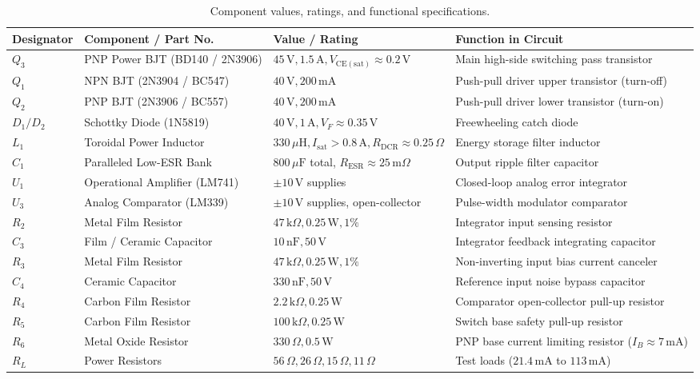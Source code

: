 \documentclass[11pt,a4paper]{article}
\begin{document}
\begin{table}[H]
\centering
\small
\caption{Component values, ratings, and functional specifications.}
\label{tab:components}
\begin{tabular}{@{}p{2.0cm}p{3.8cm}p{3.4cm}p{6.3cm}@{}}
\toprule
\textbf{Designator} & \textbf{Component / Part No.} & \textbf{Value / Rating} & \textbf{Function in Circuit} \\ \midrule
$Q_3$ & PNP Power BJT (BD140 / 2N3906) & $45\,\mathrm{V}, 1.5\,\mathrm{A}, V_{\mathrm{CE(sat)}} \approx 0.2\,\mathrm{V}$ & Main high-side switching pass transistor \\
$Q_1$ & NPN BJT (2N3904 / BC547) & $40\,\mathrm{V}, 200\,\mathrm{mA}$ & Push-pull driver upper transistor (turn-off) \\
$Q_2$ & PNP BJT (2N3906 / BC557) & $40\,\mathrm{V}, 200\,\mathrm{mA}$ & Push-pull driver lower transistor (turn-on) \\
$D_1 / D_2$ & Schottky Diode (1N5819) & $40\,\mathrm{V}, 1\,\mathrm{A}, V_F \approx 0.35\,\mathrm{V}$ & Freewheeling catch diode \\
$L_1$ & Toroidal Power Inductor & $330\,\mu\mathrm{H}, I_{\mathrm{sat}} > 0.8\,\mathrm{A}, R_{\mathrm{DCR}} \approx 0.25\,\Omega$ & Energy storage filter inductor \\
$C_1$ & Paralleled Low-ESR Bank & $800\,\mu\mathrm{F}$ total, $R_{\mathrm{ESR}} \approx 25\,\mathrm{m}\Omega$ & Output ripple filter capacitor \\
$U_1$ & Operational Amplifier (LM741) & $\pm 10\,\mathrm{V}$ supplies & Closed-loop analog error integrator \\
$U_3$ & Analog Comparator (LM339) & $\pm 10\,\mathrm{V}$ supplies, open-collector & Pulse-width modulator comparator \\
$R_2$ & Metal Film Resistor & $47\,\mathrm{k}\Omega, 0.25\,\mathrm{W}, 1\%$ & Integrator input sensing resistor \\
$C_3$ & Film / Ceramic Capacitor & $10\,\mathrm{nF}, 50\,\mathrm{V}$ & Integrator feedback integrating capacitor \\
$R_3$ & Metal Film Resistor & $47\,\mathrm{k}\Omega, 0.25\,\mathrm{W}, 1\%$ & Non-inverting input bias current canceler \\
$C_4$ & Ceramic Capacitor & $330\,\mathrm{nF}, 50\,\mathrm{V}$ & Reference input noise bypass capacitor \\
$R_4$ & Carbon Film Resistor & $2.2\,\mathrm{k}\Omega, 0.25\,\mathrm{W}$ & Comparator open-collector pull-up resistor \\
$R_5$ & Carbon Film Resistor & $100\,\mathrm{k}\Omega, 0.25\,\mathrm{W}$ & Switch base safety pull-up resistor \\
$R_6$ & Metal Oxide Resistor & $330\,\Omega, 0.5\,\mathrm{W}$ & PNP base current limiting resistor ($I_B \approx 7\,\mathrm{mA}$) \\
$R_L$ & Power Resistors & $56\,\Omega, 26\,\Omega, 15\,\Omega, 11\,\Omega$ & Test loads ($21.4\,\mathrm{mA}$ to $113\,\mathrm{mA}$) \\
\bottomrule
\end{tabular}
\end{table}
\end{document}
